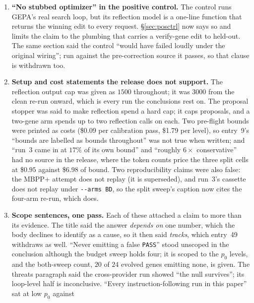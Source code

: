 \documentclass[11pt]{article}
\begin{document}
\begin{enumerate}
    the label, which is what every released report shows. The rule now reads as coded; the
    $p_0 = 0.667$ cell is NOT SUPPORTED with a ceiling warning rather than INCONCLUSIVE, and
    $\sigma_B + \sigma_D$ at $n_{\mathrm{train}} = 16$ is $0.014$, not $0.018$. The count of
    SUPPORTED cells, two, does not change.
  \item \textbf{``No stubbed optimizer'' in the positive control.} The control runs GEPA's real
    search loop, but its reflection model is a one-line function that returns the winning edit to
    every request. \S\ref{sec:posctrl} now says so and limits the claim to the plumbing that
    carries a verify-gene edit to held-out. The same section said the control ``would have failed
    loudly under the original wiring''; run against the pre-correction source it passes, so that
    clause is withdrawn too.
  \item \textbf{Setup and cost statements the release does not support.} The reflection output cap
    was given as $1500$ throughout; it was $3000$ from the clean re-run onward, which is every run
    the conclusions rest on. The proposal stopper was said to make reflection spend a hard cap; it
    caps proposals, and a two-gene arm spends up to two reflection calls on each. Two pre-flight
    bounds were printed as costs (\$0.09 per calibration
    pass, \$1.79 per level), so entry~9's ``bounds are labelled as bounds throughout'' was not true
    when written; and ``run~3 came in at $17\%$ of its own bound'' and ``roughly $6\times$
    conservative'' had no source in the release, where the token counts price the three split cells
    at \$$0.95$ against \$6.98 of bound. Two reproducibility claims were also false: the MBPP+ attempt
    does not replay (it is superseded), and run~3's cassette does not replay under
    \texttt{-{}-arms BD}, so the split sweep's caption now cites the four-arm re-run, which does.
  \item \textbf{Scope sentences, one pass.} Each of these attached a claim to more than its
    evidence. The title said the answer \emph{depends on} one number, which the body declines to
    identify as a cause, so it then said \emph{tracks}, which entry~49 withdraws as well. ``Never emitting a false \texttt{PASS}''
    stood unscoped in the conclusion although the budget sweep holds four; it is scoped to the
    $p_0$ levels, and the both-sweep count, $20$ of $24$ evolved genes emitting none, is given. The
    threats paragraph said the cross-provider run showed ``the null survives''; its loop-level half
    is inconclusive. ``Every instruction-following run in this paper'' sat at low $p_0$ against

\end{enumerate}
\end{document}
